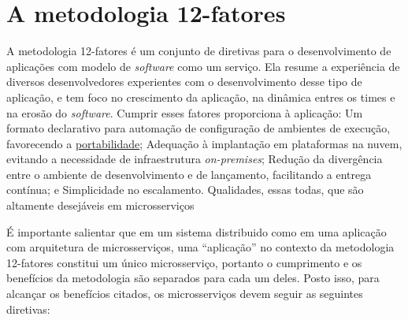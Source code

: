



\section{A metodologia 12-fatores}\label{metodologia-12-fatores}

A metodologia 12-fatores é um conjunto de diretivas para o desenvolvimento de aplicações com modelo de \emph{software} como um serviço. Ela resume a experiência de diversos desenvolvedores experientes com o desenvolvimento desse tipo de aplicação, e tem foco no crescimento da aplicação, na dinâmica entres os times e na erosão do \emph{software}. Cumprir esses fatores proporciona à aplicação: Um formato declarativo para automação de configuração de ambientes de execução, favorecendo a \hyperref[sec:portabilidade]{portabilidade}; Adequação à implantação em plataformas na nuvem, evitando a necessidade de infraestrutura \emph{on-premises}; Redução da divergência entre o ambiente de desenvolvimento e de lançamento, facilitando a entrega contínua; e Simplicidade no escalamento. Qualidades, essas todas, que são altamente desejáveis em microsserviços \cite{12factor, 12fatores-rita}

É importante salientar que em um sistema distribuido como em uma aplicação com arquitetura de microsserviços, uma “aplicação” no contexto da metodologia 12-fatores constitui um único microsserviço, portanto o cumprimento e os benefícios da metodologia são separados para cada um deles. Posto isso, para alcançar os benefícios citados, os microsserviços devem seguir as seguintes diretivas:

